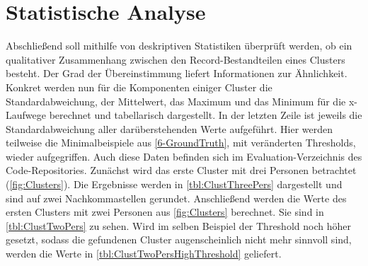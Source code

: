 \section{Statistische Analyse}
\label{6-Statistical}
Abschließend soll mithilfe von deskriptiven Statistiken überprüft werden,
ob ein qualitativer Zusammenhang zwischen den Record-Bestandteilen eines Clusters besteht.
Der Grad der Übereinstimmung liefert Informationen zur Ähnlichkeit.
Konkret werden nun für die Komponenten einiger Cluster
die Standardabweichung, der Mittelwert, das Maximum und das Minimum für die x-Laufwege berechnet
und tabellarisch dargestellt.
In der letzten Zeile ist jeweils die Standardabweichung aller darüberstehenden Werte aufgeführt.
Hier werden teilweise die Minimalbeispiele aus \autoref{6-GroundTruth}, mit veränderten Thresholds, wieder aufgegriffen.
Auch diese Daten befinden sich im Evaluation-Verzeichnis des Code-Repositories.
Zunächst wird das erste Cluster mit drei Personen betrachtet (\autoref{fig:Clusters}).
Die Ergebnisse werden in \autoref{tbl:ClustThreePers} dargestellt
und sind auf zwei Nachkommastellen gerundet.
Anschließend werden die Werte des ersten Clusters mit zwei Personen aus \autoref{fig:Clusters} berechnet.
Sie sind in \autoref{tbl:ClustTwoPers} zu sehen.
Wird im selben Beispiel der Threshold noch höher gesetzt,
sodass die gefundenen Cluster augenscheinlich nicht mehr sinnvoll sind,
werden die Werte in \autoref{tbl:ClustTwoPersHighThreshold} geliefert.
